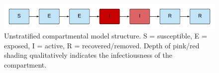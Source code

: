 
\begin{figure}[ht]
    \includegraphics[width=\textwidth]{../../tex_descriptions/models/sm_sir/sm_sir_seir.pdf}
    \caption{Unstratified compartmental model structure. 
    S = susceptible, E = exposed, I = active, R = recovered/removed. 
    Depth of pink/red shading qualitatively indicates the infectiousness of the compartment.}
    \label{fig:seeiir}
\end{figure}
